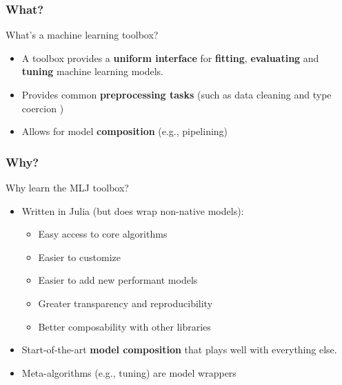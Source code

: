 \documentclass[t]{beamer}
\newcommand\df{\bf\color{Maroon}}
\begin{document}
\begin{frame}
  \frametitle{What?}
  \begin{block}{What's a machine learning toolbox?}\pause
     \begin{itemize}
     \item A toolbox provides a {\df uniform interface} for {\df fitting}, {\df
         evaluating} and {\df tuning} machine learning models.
          \item Provides common {\df preprocessing tasks} (such as data cleaning
            and type coercion )
          \item Allows for model {\df composition} (e.g., pipelining)
      \end{itemize}
    \end{block}
\end{frame}

\begin{frame}
  \frametitle{Why?}
  \begin{block}{Why learn the MLJ toolbox?}
    \begin{itemize}
    \item Written in Julia (but does wrap non-native models):\pause
      \begin{itemize}
      \item Easy access to core algorithms
      \item Easier to customize
      \item Easier to add new performant models
      \item Greater transparency and reproducibility
      \item Better composability with other libraries\pause
      \end{itemize}
    \item Start-of-the-art {\df model composition} that plays well with everything else.
    \item Meta-algorithms (e.g., tuning) are model wrappers
    \end{itemize}
  \end{block}
\end{frame}


\end{document}
